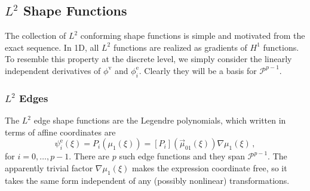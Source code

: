 
\subsection{\texorpdfstring{$L^2$}{L2} Shape Functions}

The collection of $L^2$ conforming shape functions is simple and motivated from the exact sequence. 
In 1D, all $L^2$ functions are realized as gradients of $H^1$ functions. 
To resemble this property at the discrete level, we simply consider the linearly independent derivatives of $\phi^\mathrm{v}$ and $\phi^\mathrm{e}_i$.
Clearly they will be a basis for $\mathcal{P}^{p-1}$.

\subsubsection{\texorpdfstring{$L^2$}{L2} Edges}
The $L^2$ edge shape functions are the Legendre polynomials, which written in terms of affine coordinates are
\begin{equation}
    \psi^\mathrm{e}_i(\xi) = P_i(\mu_1(\xi))= [P_i](\vec{\mu}_{01}(\xi))\nabla\mu_1(\xi)\,,\label{eq:the1DL2edge}
\end{equation}
for $i=0,\ldots,p-1$. There are $p$ such edge functions and they span $\mathcal{P}^{p-1}$. 
The apparently trivial factor $\nabla\mu_1(\xi)$ makes the expression coordinate free, so it takes the same form independent of any (possibly nonlinear) transformations.


